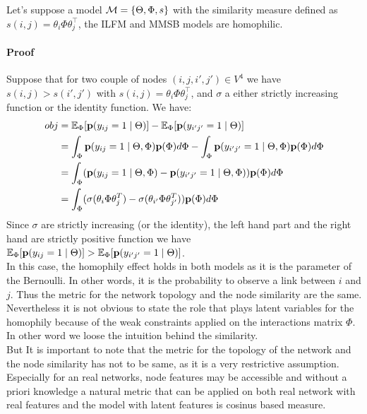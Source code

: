 \begin{proposition}[]
Let's suppose a model $ \mathcal{M}=\{\Theta, \Phi, s\}$ with the similarity measure defined as $s(i,j) = \theta_i \Phi \theta_j^\top$, the ILFM and MMSB models are homophilic.
\end{proposition}
\paragraph{Proof} 
Suppose that for two couple of nodes $(i,j,i',j') \in V^4$ we have $s(i,j) > s(i',j')$ with $s(i,j) =\theta_i \Phi \theta_j^\top$, and $\sigma$ a either strictly increasing function or the identity function. We have:
\begin{align}
obj &=\mathbb{E}_\Phi[\mathbf{p}(y_{ij}=1 \mid \Theta)] - \mathbb{E}_\Phi[\mathbf{p}(y_{i'j'} = 1  \mid \Theta)] \\
&= \int_{\Phi} \mathbf{p}(y_{ij}=1 \mid \Theta, \Phi ) \mathbf{p}(\Phi) d\Phi - \int_{\Phi}\mathbf{p}(y_{i'j'}=1 \mid \Theta, \Phi ) \mathbf{p}(\Phi) d\Phi \\
&= \int_\Phi ( \mathbf{p}(y_{ij}=1 \mid \Theta, \Phi )  - \mathbf{p}(y_{i'j'}=1 \mid \Theta, \Phi ) )\mathbf{p}(\Phi) d\Phi \\
&=  \int_\Phi ( \sigma(\theta_i \Phi  \theta_j^T) -\sigma(\theta_{i'} \Phi  \theta_{j'}^T) )\mathbf{p}(\Phi) d\Phi
\end{align}
Since $\sigma$ are strictly increasing (or the identity), the left hand part and the right hand are strictly positive function we have $\mathbb{E}_\Phi[\mathbf{p}(y_{ij}=1 \mid \Theta)] > \mathbb{E}_\Phi[\mathbf{p}(y_{i'j'} = 1  \mid \Theta)]$.~\\


In this case, the homophily effect holds in both models as it is the parameter of the Bernoulli. In other words, it is the probability to observe a link between $i$ and $j$. Thus the metric for the network topology and the node similarity are the same. Nevertheless it is not obvious to state the role that plays latent variables for the homophily because of the weak constraints applied on the interactions matrix $\Phi$. In other word we loose the intuition behind the similarity. ~\\

But It is important to note that the metric for the topology of the network and the node similarity has not to be same, as it is a very restrictive assumption. Especially for an real networks, node features may be accessible and without a priori knowledge a natural metric that can be applied on both real network with real features and the model with latent features is cosinus based measure.~\\


